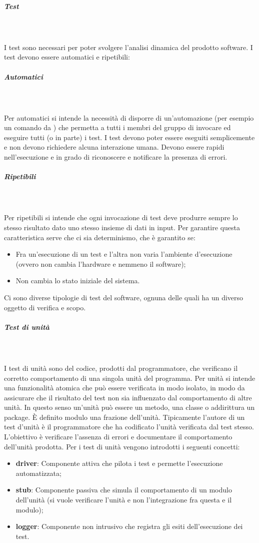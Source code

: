 \subparagraph{Test} \mbox{}\\ \\
I test sono necessari per poter svolgere l'analisi dinamica del prodotto software.
I test devono essere automatici e ripetibili:
\subparagraph*{Automatici} \mbox{}\\ \\
Per automatici si intende la necessità di disporre di un'automazione (per esempio un comando da ) che permetta a tutti i membri del gruppo di invocare ed eseguire tutti (o in parte) i test.
I test devono poter essere eseguiti semplicemente e non devono richiedere alcuna interazione umana.
Devono essere rapidi nell’esecuzione e in grado di riconoscere e notificare la presenza di errori.
\subparagraph*{Ripetibili} \mbox{}\\ \\
Per ripetibili si intende che ogni invocazione di test deve produrre sempre lo stesso risultato dato uno stesso insieme di dati in input.
Per garantire questa caratteristica serve che ci sia determinismo, che è garantito se:
\begin{itemize}
    \item Fra un'esecuzione di un test e l'altra non varia l'ambiente d'esecuzione (ovvero non cambia l'hardware e nemmeno il software);
    \item Non cambia lo stato iniziale del sistema.
\end{itemize}

Ci sono diverse tipologie di test del software, ognuna delle quali ha un diverso oggetto di verifica e scopo.

\subparagraph{Test di unità} \mbox{}\\ \\
I test di unità sono del codice, prodotti dal programmatore, che verificano il corretto comportamento di una singola unità del programma.
Per unità si intende una funzionalità atomica che può essere verificata in modo isolato, in modo da assicurare che il risultato del test non sia influenzato dal comportamento di altre unità. In questo senso un'unità può essere un metodo, una classe o addirittura un package.
È definito modulo una frazione dell'unità.
Tipicamente l'autore di un test d'unità è il programmatore che ha codificato l'unità verificata dal test stesso.
L'obiettivo è verificare l’assenza di errori e documentare il comportamento dell’unità prodotta.
Per i test di unità vengono introdotti i seguenti concetti:
\begin{itemize}
    \item \textbf{driver}: Componente attiva che pilota i test e permette l'esecuzione automatizzata;
    \item \textbf{stub}: Componente passiva che simula il comportamento di un modulo dell'unità (si vuole verificare l'unità e non l'integrazione fra questa e il modulo);
    \item \textbf{logger}: Componente non intrusivo che registra gli esiti dell'esecuzione dei test.
\end{itemize}

